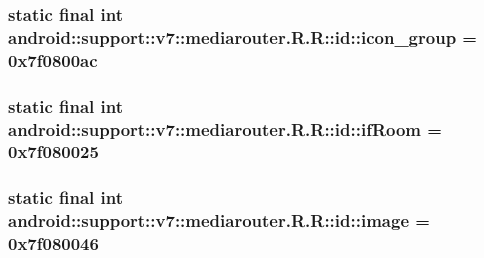 \hypertarget{classandroid_1_1support_1_1v7_1_1mediarouter_1_1_r_1_1id_d012bfb8f25522756c893b16b8ca03f4}{
\subsubsection[{icon\_\-group}]{\setlength{\rightskip}{0pt plus 5cm}static final int android::support::v7::mediarouter.R.R::id::icon\_\-group = 0x7f0800ac}}
\label{classandroid_1_1support_1_1v7_1_1mediarouter_1_1_r_1_1id_d012bfb8f25522756c893b16b8ca03f4}


\hypertarget{classandroid_1_1support_1_1v7_1_1mediarouter_1_1_r_1_1id_d53c029789af1406d8a06e3daee9e147}{
\subsubsection[{ifRoom}]{\setlength{\rightskip}{0pt plus 5cm}static final int android::support::v7::mediarouter.R.R::id::ifRoom = 0x7f080025}}
\label{classandroid_1_1support_1_1v7_1_1mediarouter_1_1_r_1_1id_d53c029789af1406d8a06e3daee9e147}


\hypertarget{classandroid_1_1support_1_1v7_1_1mediarouter_1_1_r_1_1id_56c08ed66cd379a50d7fabb54fc15e0b}{
\subsubsection[{image}]{\setlength{\rightskip}{0pt plus 5cm}static final int android::support::v7::mediarouter.R.R::id::image = 0x7f080046}}
\label{classandroid_1_1support_1_1v7_1_1mediarouter_1_1_r_1_1id_56c08ed66cd379a50d7fabb54fc15e0b}


